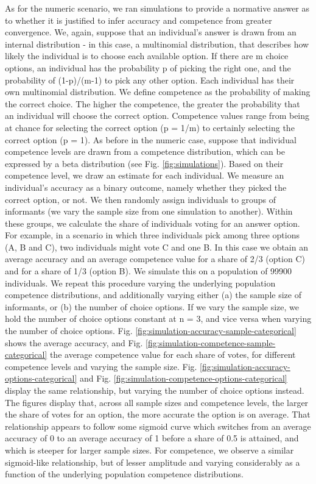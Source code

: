 \documentclass[
  doc,floatsintext]{apa6}
\begin{document}
As for the numeric scenario, we ran simulations to provide a normative answer as to whether it is justified to infer accuracy and competence from greater convergence. We, again, suppose that an individual's answer is drawn from an internal distribution - in this case, a multinomial distribution, that describes how likely the individual is to choose each available option. If there are m choice options, an individual has the probability p of picking the right one, and the probability of (1-p)/(m-1) to pick any other option. Each individual has their own multinomial distribution. We define competence as the probability of making the correct choice. The higher the competence, the greater the probability that an individual will choose the correct option. Competence values range from being at chance for selecting the correct option (p = 1/m) to certainly selecting the correct option (p = 1). As before in the numeric case, suppose that individual competence levels are drawn from a competence distribution, which can be expressed by a beta distribution (see Fig. \ref{fig:simulations}). Based on their competence level, we draw an estimate for each individual. We measure an individual's accuracy as a binary outcome, namely whether they picked the correct option, or not. We then randomly assign individuals to groups of informants (we vary the sample size from one simulation to another). Within these groups, we calculate the share of individuals voting for an answer option. For example, in a scenario in which three individuals pick among three options (A, B and C), two individuals might vote C and one B. In this case we obtain an average accuracy and an average competence value for a share of 2/3 (option C) and for a share of 1/3 (option B). We simulate this on a population of 99900 individuals. We repeat this procedure varying the underlying population competence distributions, and additionally varying either (a) the sample size of informants, or (b) the number of choice options. If we vary the sample size, we hold the number of choice options constant at n = 3, and vice versa when varying the number of choice options. Fig. \ref{fig:simulation-accuracy-sample-categorical} shows the average accuracy, and Fig. \ref{fig:simulation-competence-sample-categorical} the average competence value for each share of votes, for different competence levels and varying the sample size. Fig. \ref{fig:simulation-accuracy-options-categorical} and Fig. \ref{fig:simulation-competence-options-categorical} display the same relationship, but varying the number of choice options instead. The figures display that, across all sample sizes and competence levels, the larger the share of votes for an option, the more accurate the option is on average. That relationship appears to follow some sigmoid curve which switches from an average accuracy of 0 to an average accuracy of 1 before a share of 0.5 is attained, and which is steeper for larger sample sizes. For competence, we observe a similar sigmoid-like relationship, but of lesser amplitude and varying considerably as a function of the underlying population competence distributions.
\end{document}
